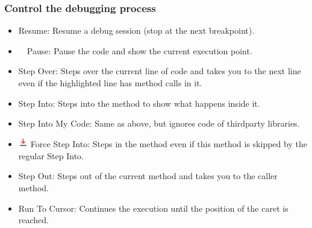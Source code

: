 \documentclass[aspectratio=169]{beamer}
\begin{document}

%     


\begin{frame}
\frametitle{Control the debugging process}
{\footnotesize
\begin{itemize}
    \item  {Resume: Resume a debug session (stop at the next breakpoint).}
    \item   \ \  Pause: Pause the code and show the current execution point.
    \item  {Step Over: Steps over the current line of code and takes you to the next line even if the highlighted line has method calls in it.}
    \item  Step Into: Steps into the method to show what happens inside it.
    \item  Step Into My Code: Same as above, but ignores code of thirdparty libraries.
    \item \includegraphics[width=1.1em]{./imgs/icons.debugger.actions.force_step_into.png} Force Step Into:     Steps in the method even if this method is skipped by the regular Step Into.
    \item  Step Out: Steps out of the current method and takes you to the caller method.
    \item  Run To Cursor: Continues the execution until the position of the caret is reached.
\end{itemize}}
\end{frame}
\end{document}
